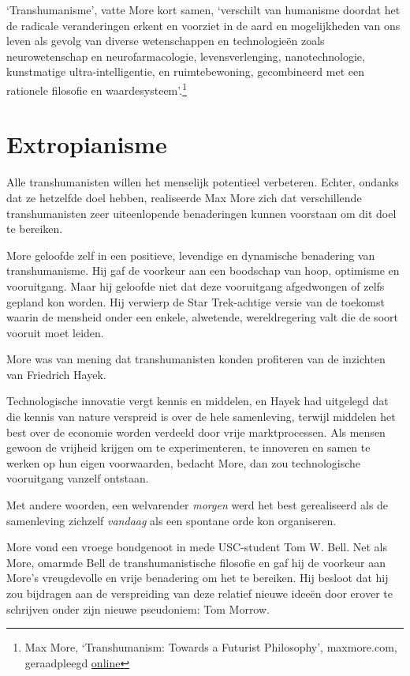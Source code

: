 \documentclass[smalldemyvopaper,11pt,twoside,onecolumn,openright,extrafontsizes,hidelinks]{memoir}
\begin{document}
`Transhumanisme', vatte More kort samen, `verschilt van humanisme
doordat het de radicale veranderingen erkent en voorziet in de aard en
mogelijkheden van ons leven als gevolg van diverse wetenschappen en
technologieën zoals neurowetenschap en neurofarmacologie,
levensverlenging, nanotechnologie, kunstmatige ultra-intelligentie, en
ruimtebewoning, gecombineerd met een rationele filosofie en
waardesysteem'.\footnote{Max More, `Transhumanism: Towards a Futurist
  Philosophy', maxmore.com, geraadpleegd
  \href{https://web.archive.org/web/20051029125153/http://www.maxmore.com/transhum.htm}{online}}

\section{Extropianisme}\label{extropianisme}

Alle transhumanisten willen het menselijk potentieel verbeteren. Echter,
ondanks dat ze hetzelfde doel hebben, realiseerde Max More zich dat
verschillende transhumanisten zeer uiteenlopende benaderingen kunnen
voorstaan om dit doel te bereiken.

More geloofde zelf in een positieve, levendige en dynamische benadering
van transhumanisme. Hij gaf de voorkeur aan een boodschap van hoop,
optimisme en vooruitgang. Maar hij geloofde niet dat deze vooruitgang
afgedwongen of zelfs gepland kon worden. Hij verwierp de Star
Trek-achtige versie van de toekomst waarin de mensheid onder een enkele,
alwetende, wereldregering valt die de soort vooruit moet leiden.

More was van mening dat transhumanisten konden profiteren van de
inzichten van Friedrich Hayek.

Technologische innovatie vergt kennis en middelen, en Hayek had
uitgelegd dat die kennis van nature verspreid is over de hele
samenleving, terwijl middelen het best over de economie worden verdeeld
door vrije marktprocessen. Als mensen gewoon de vrijheid krijgen om te
experimenteren, te innoveren en samen te werken op hun eigen
voorwaarden, bedacht More, dan zou technologische vooruitgang vanzelf
ontstaan.

Met andere woorden, een welvarender \emph{morgen} werd het best
gerealiseerd als de samenleving zichzelf \emph{vandaag} als een spontane
orde kon organiseren.

More vond een vroege bondgenoot in mede USC-student Tom W. Bell. Net als
More, omarmde Bell de transhumanistische filosofie en gaf hij de
voorkeur aan More's vreugdevolle en vrije benadering om het te bereiken.
Hij besloot dat hij zou bijdragen aan de verspreiding van deze relatief
nieuwe ideeën door erover te schrijven onder zijn nieuwe pseudoniem: Tom
Morrow.
\end{document}
